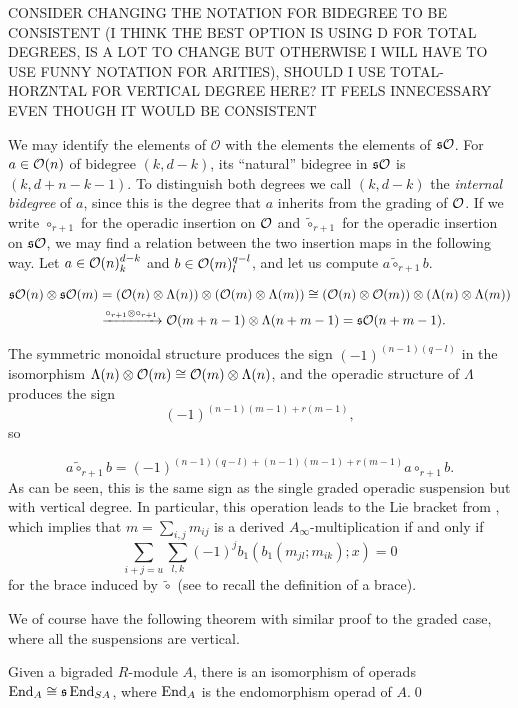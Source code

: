 \documentclass[join.tex]{subfiles}
\begin{document}
CONSIDER CHANGING THE NOTATION FOR BIDEGREE TO BE CONSISTENT (I THINK THE BEST OPTION IS USING D FOR TOTAL DEGREES, IS A LOT TO CHANGE BUT OTHERWISE I WILL HAVE TO USE FUNNY NOTATION FOR ARITIES), SHOULD I USE TOTAL-HORZNTAL FOR VERTICAL DEGREE HERE? IT FEELS INNECESSARY EVEN THOUGH IT WOULD BE CONSISTENT

We may identify the elements of $\mathcal{O}$ with the elements the elements of $\mathfrak{s}{\mathcal O}$. For $a\in{\mathcal O}(n)$ of bidegree $(k,d-k)$, its ``natural'' bidegree in $\mathfrak{s}{\mathcal O}$ is $(k,d+n-k-1)$. To distinguish both degrees we call $(k,d-k)$ the \emph{internal bidegree} of $a$, since this is the degree that $a$ inherits from the grading of ${\mathcal O}$. If we write $\circ_{r+1}$ for the operadic insertion on ${\mathcal O}$ and $\tilde{\circ}_{r+1}$ for the operadic insertion on $\mathfrak{s}{\mathcal O}$, we may find a relation between the two insertion maps in the following way. Let $a\in{\mathcal O}(n)^{d-k}_k$ and $b\in{\mathcal O}(m)^{q-l}_l$, and let us compute $a\tilde{\circ}_{r+1} b$.

\begin{align*}
\mathfrak{s}{\mathcal O}(n)\otimes\mathfrak{s}{\mathcal O}(m)&=({\mathcal O}(n)\otimes\Lambda(n))\otimes ({\mathcal O}(m)\otimes\Lambda(m))\cong ({\mathcal O}(n)\otimes {\mathcal O}(m))\otimes (\Lambda(n)\otimes \Lambda(m))\\
&\xrightarrow{\circ_{r+1}\otimes\circ_{r+1}} {\mathcal O}(m+n-1)\otimes \Lambda(n+m-1)=\mathfrak{s}{\mathcal O}(n+m-1).
\end{align*}

The symmetric monoidal structure produces the sign $(-1)^{(n-1)(q-l)}$ in the isomorphism $\Lambda(n)\otimes {\mathcal O}(m)\cong{\mathcal O}(m)\otimes\Lambda(n)$, and the operadic structure of $\Lambda$ produces the sign $$(-1)^{(n-1)(m-1)+r(m-1)},$$ so 

\begin{equation}\label{sign}
a\tilde{\circ}_{r+1}b=(-1)^{(n-1)(q-l)+(n-1)(m-1)+r(m-1)}a\circ_{r+1} b.
\end{equation}
As can be seen, this is the same sign as the single graded operadic suspension but with vertical degree. In particular, this operation leads to the Lie bracket from \cite{RW}, which implies that $m=\sum_{i,j}m_{ij}$ is a derived $A_\infty$-multiplication if and only if
\begin{equation}\label{sharp}
\sum_{i+j=u}\sum_{l,k}(-1)^jb_1(b_1(m_{jl};m_{ik});x)=0
\end{equation}
for the brace induced by $\tilde{\circ}$ (see  to recall the definition of a brace).

We of course have the following theorem with similar proof to the graded case, where all the suspensions are vertical.
\begin{thm}\label{markl}
Given a bigraded $R$-module $A$, there is an isomorphism of operads $\operatorname{End}_{ A}\cong \mathfrak{s}\operatorname{End}_{SA}$, where $\operatorname{End}_A$ is the endomorphism operad of $A$.\qed
\end{thm}
\end{document}
